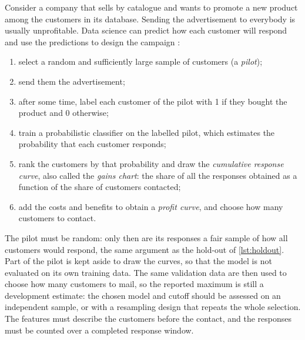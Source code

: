 Consider a company that sells by catalogue and wants to promote a new product among the customers in its database. Sending
the advertisement to everybody is usually unprofitable. Data science can predict how each customer will respond and use the
predictions to design the campaign \citep{ling1998data}:
\begin{enumerate}
  \item select a random and sufficiently large sample of customers (a \emph{pilot});
  \item send them the advertisement;
  \item after some time, label each customer of the pilot with 1 if they bought the product and 0 otherwise;
  \item train a probabilistic classifier on the labelled pilot, which estimates the probability that each customer responds;
  \item rank the customers by that probability and draw the \emph{cumulative response curve}, also called the \emph{gains
        chart}: the share of all the responses obtained as a function of the share of customers contacted;
  \item add the costs and benefits to obtain a \emph{profit curve}, and choose how many customers to contact.
\end{enumerate}
The pilot must be random: only then are its responses a fair sample of how all customers would respond, the same argument
as the hold-out of \cref{lst:holdout}. Part of the pilot is kept aside to draw the curves, so that the model is not
evaluated on its own training data. The same validation data are then used to choose how many customers to
mail, so the reported maximum is still a development estimate: the chosen model and cutoff should be assessed on
an independent sample, or with a resampling design that repeats the whole selection. The features must describe
the customers before the contact, and the responses must be counted over a completed response window.

